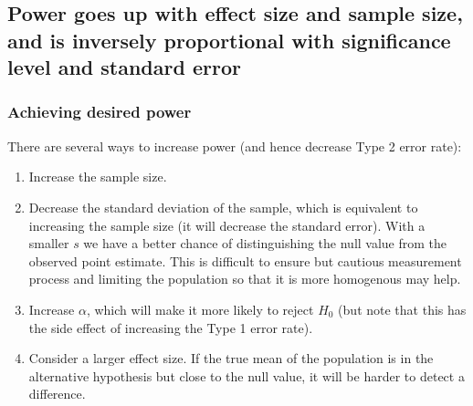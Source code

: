 \documentclass[11pt,containsverbatim,handout,xcolor=xelatex,dvipsnames,table]{beamer}
\begin{document}

\subsection{Power goes up with effect size and sample size, and is inversely proportional
with significance level and standard error}
\label{mi5}


\begin{frame}
\frametitle{Achieving desired power}

There are several ways to increase power (and hence decrease Type 2 error rate):

\pause

\begin{enumerate}

\item Increase the sample size.

\pause

\item Decrease the standard deviation of the sample, which is equivalent to increasing the 
sample size (it will decrease the standard error). With a smaller $s$ we have a better chance 
of distinguishing the null value from the observed point estimate. This is difficult to ensure but 
cautious measurement process and limiting the population so that it is more homogenous may help.

\pause

\item Increase $\alpha$, which will make it more likely to reject $H_0$ (but note that this has the 
side effect of increasing the Type 1 error rate).

\pause

\item Consider a larger effect size. If the true mean of the population is in the alternative hypothesis 
but close to the null value, it will be harder to detect a difference.

\end{enumerate}

\end{frame}

\end{document}
